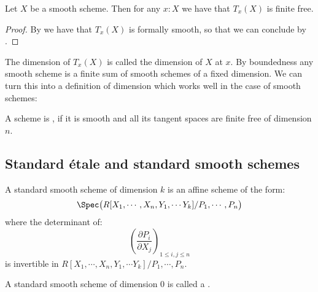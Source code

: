 \begin{proposition}\label{smooth-have-free-tangent}
Let $X$ be a smooth scheme. Then for any $x:X$ we have that $T_x(X)$ is finite free.
\end{proposition}

\begin{proof}
By  we have that $T_x(X)$ is formally smooth, so that we can conclude by .
\end{proof}

The dimension of $T_x(X)$ is called the dimension of $X$ at $x$. By boundedness any smooth scheme is a finite sum of smooth schemes of a fixed dimension.
We can turn this into a definition of dimension which works well in the case of smooth schemes:

\begin{definition}
  \label{definition-smooth-dim-n}
  A scheme is , if it is smooth and all its tangent spaces are finite free of dimension $n$.
\end{definition}


\subsection{Standard étale and standard smooth schemes}

\begin{definition}
A standard smooth scheme of dimension $k$ is an affine scheme of the form:
\[\Spec\big(R[X_1,\cdots,X_n,Y_1,\cdots Y_{k}] / P_1,\cdots,P_n\big)\]
where the determinant of:
\[\left( \frac{\partial P_i}{\partial X_j}\right)_{1\leq i,j\leq n}\]
is invertible in $R[X_1,\cdots,X_n,Y_1,\cdots Y_{k}] / P_1,\cdots,P_n$.
\end{definition}

\begin{definition}
A standard smooth scheme of dimension $0$ is called a .
\end{definition}


